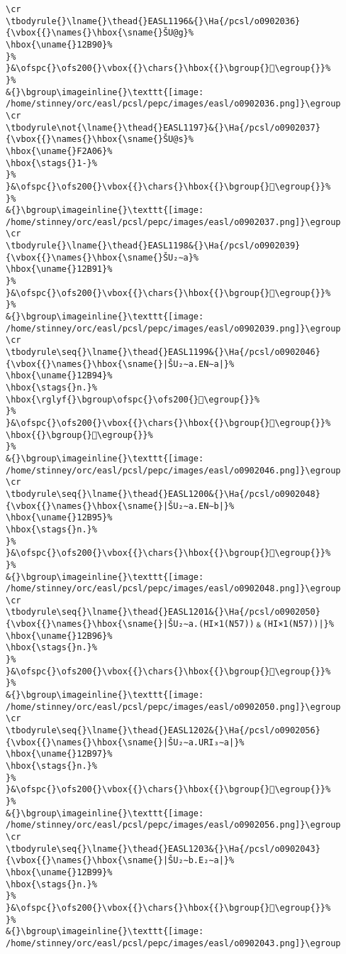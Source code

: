 \begin{verbatim}
\cr
\tbodyrule{}\lname{}\thead{}EASL1196&{}\Ha{/pcsl/o0902036}{\vbox{{}\names{}\hbox{\sname{}ŠU@g}%
\hbox{\uname{}12B90}%
}%
}&\ofspc{}\ofs200{}\vbox{{}\chars{}\hbox{{}\bgroup{}𒮐\egroup{}}%
}%
&{}\bgroup\imageinline{}\texttt{[image: /home/stinney/orc/easl/pcsl/pepc/images/easl/o0902036.png]}\egroup
\cr
\tbodyrule\not{\lname{}\thead{}EASL1197}&{}\Ha{/pcsl/o0902037}{\vbox{{}\names{}\hbox{\sname{}ŠU@s}%
\hbox{\uname{}F2A06}%
\hbox{\stags{}1-}%
}%
}&\ofspc{}\ofs200{}\vbox{{}\chars{}\hbox{{}\bgroup{}󲨆\egroup{}}%
}%
&{}\bgroup\imageinline{}\texttt{[image: /home/stinney/orc/easl/pcsl/pepc/images/easl/o0902037.png]}\egroup
\cr
\tbodyrule{}\lname{}\thead{}EASL1198&{}\Ha{/pcsl/o0902039}{\vbox{{}\names{}\hbox{\sname{}ŠU₂∼a}%
\hbox{\uname{}12B91}%
}%
}&\ofspc{}\ofs200{}\vbox{{}\chars{}\hbox{{}\bgroup{}𒮑\egroup{}}%
}%
&{}\bgroup\imageinline{}\texttt{[image: /home/stinney/orc/easl/pcsl/pepc/images/easl/o0902039.png]}\egroup
\cr
\tbodyrule\seq{}\lname{}\thead{}EASL1199&{}\Ha{/pcsl/o0902046}{\vbox{{}\names{}\hbox{\sname{}|ŠU₂∼a.EN∼a|}%
\hbox{\uname{}12B94}%
\hbox{\stags{}n.}%
\hbox{\rglyf{}\bgroup\ofspc{}\ofs200{}𒮔\egroup{}}%
}%
}&\ofspc{}\ofs200{}\vbox{{}\chars{}\hbox{{}\bgroup{}𒮓\egroup{}}%
\hbox{{}\bgroup{}𒮔\egroup{}}%
}%
&{}\bgroup\imageinline{}\texttt{[image: /home/stinney/orc/easl/pcsl/pepc/images/easl/o0902046.png]}\egroup
\cr
\tbodyrule\seq{}\lname{}\thead{}EASL1200&{}\Ha{/pcsl/o0902048}{\vbox{{}\names{}\hbox{\sname{}|ŠU₂∼a.EN∼b|}%
\hbox{\uname{}12B95}%
\hbox{\stags{}n.}%
}%
}&\ofspc{}\ofs200{}\vbox{{}\chars{}\hbox{{}\bgroup{}𒮕\egroup{}}%
}%
&{}\bgroup\imageinline{}\texttt{[image: /home/stinney/orc/easl/pcsl/pepc/images/easl/o0902048.png]}\egroup
\cr
\tbodyrule\seq{}\lname{}\thead{}EASL1201&{}\Ha{/pcsl/o0902050}{\vbox{{}\names{}\hbox{\sname{}|ŠU₂∼a.(HI×1(N57))﹠(HI×1(N57))|}%
\hbox{\uname{}12B96}%
\hbox{\stags{}n.}%
}%
}&\ofspc{}\ofs200{}\vbox{{}\chars{}\hbox{{}\bgroup{}𒮖\egroup{}}%
}%
&{}\bgroup\imageinline{}\texttt{[image: /home/stinney/orc/easl/pcsl/pepc/images/easl/o0902050.png]}\egroup
\cr
\tbodyrule\seq{}\lname{}\thead{}EASL1202&{}\Ha{/pcsl/o0902056}{\vbox{{}\names{}\hbox{\sname{}|ŠU₂∼a.URI₃∼a|}%
\hbox{\uname{}12B97}%
\hbox{\stags{}n.}%
}%
}&\ofspc{}\ofs200{}\vbox{{}\chars{}\hbox{{}\bgroup{}𒮗\egroup{}}%
}%
&{}\bgroup\imageinline{}\texttt{[image: /home/stinney/orc/easl/pcsl/pepc/images/easl/o0902056.png]}\egroup
\cr
\tbodyrule\seq{}\lname{}\thead{}EASL1203&{}\Ha{/pcsl/o0902043}{\vbox{{}\names{}\hbox{\sname{}|ŠU₂∼b.E₂∼a|}%
\hbox{\uname{}12B99}%
\hbox{\stags{}n.}%
}%
}&\ofspc{}\ofs200{}\vbox{{}\chars{}\hbox{{}\bgroup{}𒮙\egroup{}}%
}%
&{}\bgroup\imageinline{}\texttt{[image: /home/stinney/orc/easl/pcsl/pepc/images/easl/o0902043.png]}\egroup

\end{verbatim}

